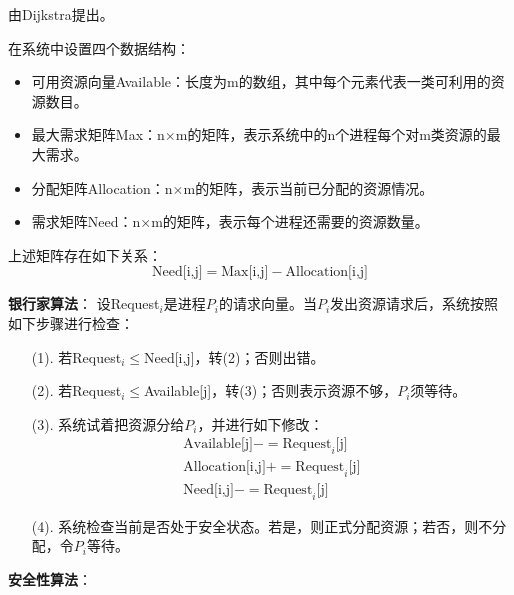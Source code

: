 \documentclass[12pt, a4paper, oneside]{ctexart}
\begin{document}
由Dijkstra提出。

在系统中设置四个数据结构：
\begin{itemize}
    \item 可用资源向量Available：长度为m的数组，其中每个元素代表一类可利用的资源数目。
    \item 最大需求矩阵Max：n$\times$m的矩阵，表示系统中的n个进程每个对m类资源的最大需求。
    \item 分配矩阵Allocation：n$\times$m的矩阵，表示当前已分配的资源情况。
    \item 需求矩阵Need：n$\times$m的矩阵，表示每个进程还需要的资源数量。
\end{itemize}

上述矩阵存在如下关系：
\begin{equation*}
    \text{Need[i,j]}=\text{Max[i,j]}-\text{Allocation[i,j]}
\end{equation*}

\vspace{10pt}

\textbf{银行家算法}：
设Request$_i$是进程$P_i$的请求向量。当$P_i$发出资源请求后，系统按照如下步骤进行检查：

\begin{enumerate}
    \item [(1). ] 若Request$_i\leq$Need[i,j]，转(2)；否则出错。
    \item [(2). ] 若Request$_i\leq$Available[j]，转(3)；否则表示资源不够，$P_i$须等待。
    \item [(3). ] 系统试着把资源分给$P_i$，并进行如下修改：
    \begin{gather*}
        \text{Available[j]}-=\text{Request}_i\text{[j]}\\
        \text{Allocation[i,j]}+=\text{Request}_i\text{[j]}\\
        \text{Need[i,j]}-=\text{Request}_i\text{[j]}
    \end{gather*}
    \item [(4). ] 系统检查当前是否处于安全状态。若是，则正式分配资源；若否，则不分配，令$P_i$等待。
\end{enumerate}

\vspace{10pt}

\textbf{安全性算法}：
\end{document}
